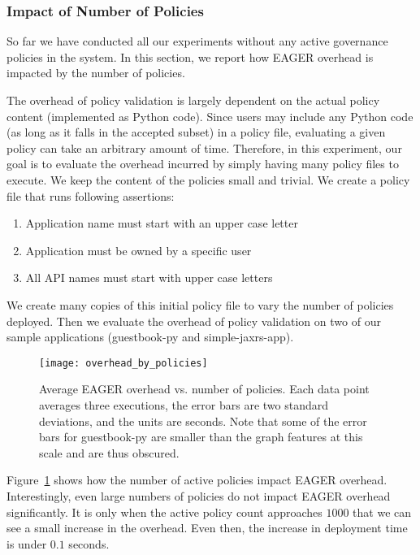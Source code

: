 \subsubsection{Impact of Number of Policies}

So far we have conducted all our experiments without any active governance 
policies in the system. In this section, we report how EAGER overhead
is impacted by the number of policies.

The overhead of policy validation is largely dependent on the actual policy
content (implemented as Python code). Since users may include any Python code 
(as long as it falls in the accepted subset) in a policy file, evaluating a
given policy can take an arbitrary amount of time.  Therefore, in this
experiment, our goal is to evaluate the overhead incurred by simply having
many policy files to execute. We keep the content of the policies small and
trivial. We create a policy file that runs following assertions:
\begin{enumerate} 
\vspace{0.05in}
\item Application name must start with an upper case letter
\vspace{0.05in}
\item Application must be owned by a specific user 
\vspace{0.05in}
\item All API names must start with upper case letters 
\vspace{0.05in}
\end{enumerate} We create many copies of this
initial policy file to vary the number of policies deployed. Then we evaluate
the overhead of policy validation on two of our sample applications
(guestbook-py and simple-jaxrs-app). 

\begin{figure}
\centering
\texttt{[image: overhead\_by\_policies]}
\caption{Average EAGER overhead vs. number of policies.  Each data point
averages three executions, the error bars are two standard deviations, and the
units are seconds. Note that some of the error bars for 
guestbook-py are smaller than the graph features at this scale and are thus obscured.}
\label{fig:overhead_by_policies}
\vspace{-0.2in}
\end{figure}

Figure~\ref{fig:overhead_by_policies} shows how the number of active policies
impact EAGER overhead. Interestingly, even large numbers of policies 
do not impact EAGER overhead significantly. It is only when the active
policy count approaches $1000$ that we can see a small increase in the
overhead. Even then, the increase in deployment time is under $0.1$ seconds. 

